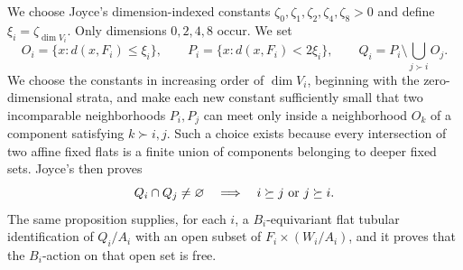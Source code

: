 \documentclass[11pt]{article}
\theoremstyle{remark}\newtheorem{remark}[theorem]{Remark}
\begin{document}
We choose Joyce's dimension-indexed constants
$\zeta_0,\zeta_1,\zeta_2,\zeta_4,\zeta_8>0$ and define
$\xi_i=\zeta_{\dim V_i}$.  Only dimensions $0,2,4,8$ occur.  We set
\begin{equation}\label{eq:Joyce-neighborhoods}
 O_i=\{x:d(x,F_i)\leq\xi_i\},\qquad
 P_i=\{x:d(x,F_i)<2\xi_i\},\qquad
 Q_i=P_i\setminus\bigcup_{j\succ i}O_j.
\end{equation}
We choose the constants in increasing order of $\dim V_i$, beginning with
the zero-dimensional strata, and make each new constant sufficiently small
that two incomparable neighborhoods $P_i,P_j$ can meet only inside a
neighborhood $O_k$ of a component satisfying $k\succ i,j$.  Such a choice
exists because every intersection of two affine fixed flats is a finite
union of components belonging to deeper fixed sets.  Joyce's
\cite[Proposition 13.2.4]{JoyceBook} then proves
\[
 Q_i\cap Q_j\ne\varnothing\quad\Longrightarrow\quad
 i\succeq j\ \hbox{or}\ j\succeq i.
\]
The same proposition supplies, for each $i$, a $B_i$-equivariant flat
tubular identification of $Q_i/A_i$ with an open subset of
$F_i\times(W_i/A_i)$, and it proves that the $B_i$-action on that open set
is free.
\end{document}
